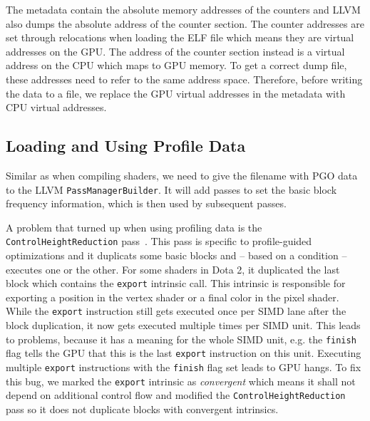 The metadata contain the absolute memory addresses of the counters and LLVM also dumps the absolute address of the counter section. The counter addresses are set through relocations when loading the ELF file which means they are virtual addresses on the GPU. The address of the counter section instead is a virtual address on the CPU which maps to GPU memory. To get a correct dump file, these addresses need to refer to the same address space. Therefore, before writing the data to a file, we replace the GPU virtual addresses in the metadata with CPU virtual addresses.

\subsection{Loading and Using Profile Data}
\label{sub:load}
Similar as when compiling shaders, we need to give the filename with PGO data to the LLVM \texttt{PassManagerBuilder}. It will add passes to set the basic block frequency information, which is then used by subsequent passes.

A problem that turned up when using profiling data is the \texttt{ControlHeightReduction} pass~\cite{ControlHeightReduction}.
This pass is specific to profile-guided optimizations and it duplicats some basic blocks and -- based on a condition -- executes one or the other.
For some shaders in Dota 2, it duplicated the last block which contains the \texttt{export} intrinsic call. This intrinsic is responsible for exporting a position in the vertex shader or a final color in the pixel shader.
While the \texttt{export} instruction still gets executed once per SIMD lane after the block duplication, it now gets executed multiple times per SIMD unit.
This leads to problems, because it has a meaning for the whole SIMD unit, e.g. the \texttt{finish} flag tells the GPU that this is the last \texttt{export} instruction on this unit. Executing multiple \texttt{export} instructions with the \texttt{finish} flag set leads to GPU hangs.
To fix this bug, we marked the \texttt{export} intrinsic as \emph{convergent} which means it shall not depend on additional control flow and modified the \texttt{ControlHeightReduction} pass so it does not duplicate blocks with convergent intrinsics.
